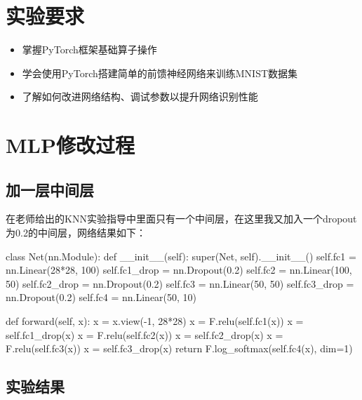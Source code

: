 \documentclass[UTF8,a4paper,10pt]{ctexart}
\begin{document}
\section{实验要求}

\begin{itemize}
    \item 掌握PyTorch框架基础算子操作
    \item 学会使用PyTorch搭建简单的前馈神经网络来训练MNIST数据集
    \item 了解如何改进网络结构、调试参数以提升网络识别性能
\end{itemize}

\section{MLP修改过程}


\subsection{加一层中间层}
在老师给出的KNN实验指导中里面只有一个中间层，在这里我又加入一个dropout为0.2的中间层，网络结果如下：


\begin{python}
class Net(nn.Module):
    def __init__(self):
        super(Net, self).__init__()
        self.fc1 = nn.Linear(28*28, 100)
        self.fc1_drop = nn.Dropout(0.2)
        self.fc2 = nn.Linear(100, 50)
        self.fc2_drop = nn.Dropout(0.2)
        self.fc3 = nn.Linear(50, 50)
        self.fc3_drop = nn.Dropout(0.2)
        self.fc4 = nn.Linear(50, 10)

    def forward(self, x):
        x = x.view(-1, 28*28)
        x = F.relu(self.fc1(x))
        x = self.fc1_drop(x)
        x = F.relu(self.fc2(x))
        x = self.fc2_drop(x)
        x = F.relu(self.fc3(x))
        x = self.fc3_drop(x)
        return F.log_softmax(self.fc4(x), dim=1)
\end{python}

\subsection{实验结果}
\end{document}
